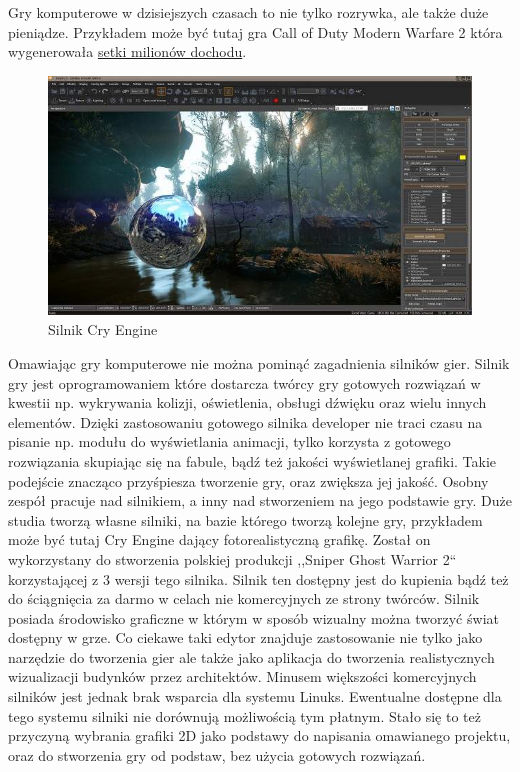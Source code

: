 Gry komputerowe w dzisiejszych czasach to nie tylko rozrywka, ale także duże pieniądze. Przykładem może być tutaj gra Call of Duty Modern Warfare 2 która wygenerowała \href{http://www.cdaction.pl/news-10119/wiedziales-call-of-duty-wygenerowalo-3-miliardy--dolarow-przychodu.html}{setki milionów dochodu}.
 
\begin{figure}[h]
    \centering
    \includegraphics[height=240px]{./Pictures/cryengine.jpg}
    \caption{Silnik Cry Engine}
\end{figure}
  
Omawiając gry komputerowe nie można pominąć zagadnienia silników gier. Silnik gry jest oprogramowaniem które dostarcza twórcy gry gotowych rozwiązań w kwestii np. wykrywania kolizji, oświetlenia, obsługi dźwięku oraz wielu innych elementów. Dzięki zastosowaniu gotowego silnika developer nie traci czasu na pisanie np. modułu do wyświetlania animacji, tylko korzysta z gotowego rozwiązania skupiając się na fabule, bądź też jakości wyświetlanej grafiki. Takie podejście znacząco przyśpiesza tworzenie gry, oraz zwiększa jej jakość. Osobny zespół pracuje nad silnikiem, a inny nad stworzeniem na jego podstawie gry. Duże studia tworzą własne silniki, na bazie którego tworzą kolejne gry, przykładem może być tutaj Cry Engine dający fotorealistyczną grafikę. Został on wykorzystany do stworzenia polskiej produkcji ,,Sniper Ghost Warrior 2`` korzystającej z  3 wersji tego silnika. Silnik ten dostępny jest do kupienia bądź też do ściągnięcia za darmo w celach nie komercyjnych ze strony twórców. Silnik posiada środowisko graficzne w którym w sposób wizualny można tworzyć świat dostępny w grze. Co ciekawe taki edytor znajduje zastosowanie nie tylko jako narzędzie do tworzenia gier ale także jako aplikacja do tworzenia realistycznych wizualizacji budynków przez architektów. Minusem większości komercyjnych silników jest jednak brak wsparcia dla systemu Linuks. Ewentualne dostępne dla tego systemu silniki nie dorównują możliwością tym płatnym. Stało się to też przyczyną wybrania grafiki 2D jako podstawy do napisania omawianego projektu, oraz do stworzenia gry od podstaw, bez użycia gotowych rozwiązań. 


